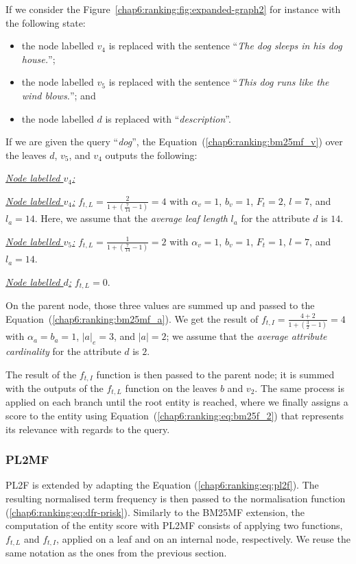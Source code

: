 If we consider the Figure~\ref{chap6:ranking:fig:expanded-graph2} for instance with the following state:
\begin{itemize}
	\item the node labelled $v_4$ is replaced with the sentence ``\textit{The dog sleeps in his dog house.}'';
	\item the node labelled $v_5$ is replaced with the sentence ``\textit{This dog runs like the wind blows.}''; and
	\item the node labelled $d$ is replaced with ``\textit{description}''.
\end{itemize}
If we are given the query ``\textit{dog}'', the Equation~(\ref{chap6:ranking:bm25mf_v}) over the leaves $d$, $v_5$, and $v_4$ outputs the following:
\begin{labeling}{\textit{\underline{Node labelled $v_4$:}}}
	\item[\textit{\underline{Node labelled $v_4$:}}] $f_{t,L} = \frac{2}{1 + (\frac{7}{14} - 1)} = 4$ with $\alpha_v=1$, $b_v=1$, $F_t=2$, $l=7$, and $l_a=14$. Here, we assume that the \emph{average leaf length} $l_a$ for the attribute $d$ is $14$.
	\item[\textit{\underline{Node labelled $v_5$:}}] $f_{t,L} = \frac{1}{1 + (\frac{7}{14} - 1)} = 2$ with $\alpha_v=1$, $b_v=1$, $F_t=1$, $l=7$, and $l_a=14$.
	\item[\textit{\underline{Node labelled $d$:}}] $f_{t,L} = 0$.
\end{labeling}
On the parent node, those three values are summed up and passed to the Equation~(\ref{chap6:ranking:bm25mf_a}). We get the result of $f_{t,I} = \frac{4 + 2}{1 + (\frac{3}{2} - 1)} = 4$ with $\alpha_a=b_a=1$, $\left|{a}\right|_e=3$, and $\left|{a}\right| = 2$; we assume that the \emph{average attribute cardinality} for the attribute $d$ is $2$.

The result of the $f_{t,I}$ function is then passed to the parent node; it is summed with the outputs of the $f_{t,L}$ function on the leaves $b$ and $v_2$. The same process is applied on each branch until the root entity is reached, where we finally assigns a score to the entity using Equation~(\ref{chap6:ranking:eq:bm25f_2}) that represents its relevance with regards to the query.

\subsubsection{PL2MF}

PL2F is extended by adapting the Equation (\ref{chap6:ranking:eq:pl2f}). The resulting normalised term frequency is then passed to the normalisation function (\ref{chap6:ranking:eq:dfr-prisk}).
Similarly to the \gls{BM25MF} extension, the computation of the entity score with \gls{PL2MF} consists of applying two functions, $f_{t,L}$ and $f_{t,I}$, applied on a leaf and on an internal node, respectively. We reuse the same notation as the ones from the previous section.\\ 

